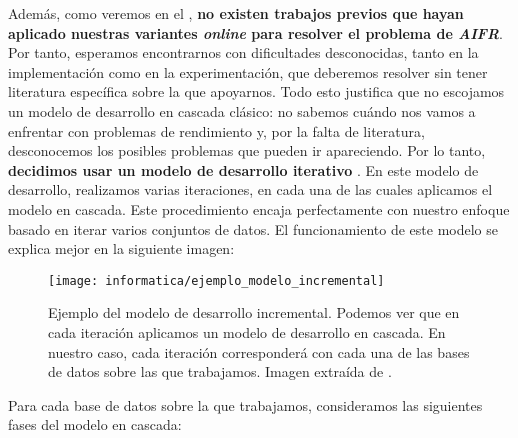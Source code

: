 Además, como veremos en el , \textbf{no existen trabajos previos que hayan aplicado nuestras variantes \textit{online} para resolver el problema de \textit{AIFR}}. Por tanto, esperamos encontrarnos con dificultades desconocidas, tanto en la implementación como en la experimentación, que deberemos resolver sin tener literatura específica sobre la que apoyarnos. Todo esto justifica que no escojamos un modelo de desarrollo en cascada clásico: no sabemos cuándo nos vamos a enfrentar con problemas de rendimiento y, por la falta de literatura, desconocemos los posibles problemas que pueden ir apareciendo. Por lo tanto, \textbf{decidimos usar un modelo de desarrollo iterativo} \cite{informatica:libro_metodologias_desarrollo}. En este modelo de desarrollo, realizamos varias iteraciones, en cada una de las cuales aplicamos el modelo en cascada. Este procedimiento encaja perfectamente con nuestro enfoque basado en iterar varios conjuntos de datos. El funcionamiento de este modelo se explica mejor en la siguiente imagen:

\begin{figure}[H]
	\centering
	\texttt{[image: informatica/ejemplo\_modelo\_incremental]}
	\caption{Ejemplo del modelo de desarrollo incremental. Podemos ver que en cada iteración aplicamos un modelo de desarrollo en cascada. En nuestro caso, cada iteración corresponderá con cada una de las bases de datos sobre las que trabajamos. Imagen extraída de \cite{informatica:libro_metodologias_desarrollo}.}
\end{figure}

Para cada base de datos sobre la que trabajamos, consideramos las siguientes fases del modelo en cascada:

